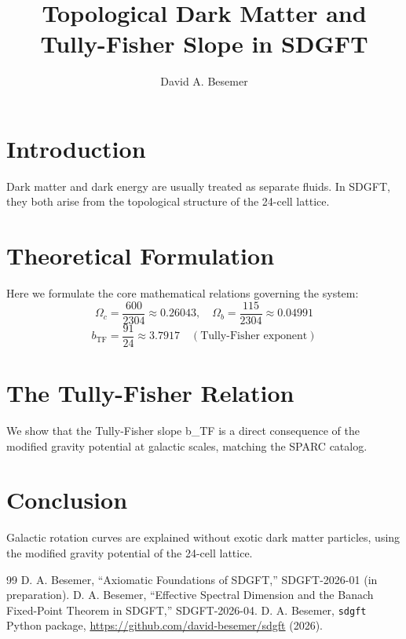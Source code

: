 \documentclass[a4paper,11pt]{article}
\begin{document}
\title{Topological Dark Matter and Tully-Fisher Slope in SDGFT}

\author{David A. Besemer}



\maketitle

\section{Introduction}
Dark matter and dark energy are usually treated as separate fluids. In SDGFT, they both arise from the topological structure of the 24-cell lattice.

\section{Theoretical Formulation}
Here we formulate the core mathematical relations governing the system:
\begin{equation}
  \Omega_c = \frac{600}{2304} \approx 0.26043, \quad \Omega_b = \frac{115}{2304} \approx 0.04991
\end{equation}
\begin{equation}
  b_{\text{TF}} = \frac{91}{24} \approx 3.7917 \quad (\text{Tully-Fisher exponent})
\end{equation}
\section{The Tully-Fisher Relation}
We show that the Tully-Fisher slope b_TF is a direct consequence of the modified gravity potential at galactic scales, matching the SPARC catalog.

\section{Conclusion}
Galactic rotation curves are explained without exotic dark matter particles, using the modified gravity potential of the 24-cell lattice.



\begin{thebibliography}{99}
 D. A. Besemer, ``Axiomatic Foundations of SDGFT,'' SDGFT-2026-01 (in preparation).
 D. A. Besemer, ``Effective Spectral Dimension and the Banach Fixed-Point Theorem in SDGFT,'' SDGFT-2026-04.
 D. A. Besemer, \texttt{sdgft} Python package, \url{https://github.com/david-besemer/sdgft} (2026).
\end{thebibliography}
\end{document}

